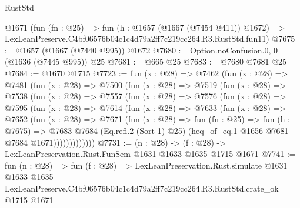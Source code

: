 \begin{lexlean}{RustStd}
\begin{coremodule}
    @1671
    (fun (fn : @25) =>
    fun (h : @1657 (@1667 (@7454 @411)) @1672) =>
    LexLeanPreserve.C4bf06576b04c1c4d79a2ff7c219cc264.R3.RustStd.fun11)
@7675 := @1657 (@1667 (@7440 @995)) @1672
@7680 := Option.noConfusion.{0, 0} (@1636 (@7445 @995)) @25
@7681 := @665 @25
@7683 := @7680 @7681 @25
@7684 := @1670 @1715
@7723 := fun (x : @28) =>
  @7462
    (fun (x : @28) =>
    @7481
      (fun (x : @28) =>
      @7500
        (fun (x : @28) =>
        @7519
          (fun (x : @28) =>
          @7538
            (fun (x : @28) =>
            @7557
              (fun (x : @28) =>
              @7576
                (fun (x : @28) =>
                @7595
                  (fun (x : @28) =>
                  @7614
                    (fun (x : @28) =>
                    @7633
                      (fun (x : @28) =>
                      @7652
                        (fun (x : @28) =>
                        @7671
                          (fun (x : @28) =>
                          fun (fn : @25) =>
                          fun (h : @7675) =>
                          @7683
                            @7684
                            (Eq.refl.{2} (Sort 1) @25)
                            (heq_of_eq.{1} @1656 @7681 @7684 @1671)))))))))))))
@7731 := (n : @28) -> (f : @28) -> LexLeanPreservation.Rust.FunSem @1631 @1633 @1635 @1715 @1671
@7741 := fun (n : @28) =>
  fun (f : @28) =>
  LexLeanPreservation.Rust.simulate
    @1631
    @1633
    @1635
    LexLeanPreserve.C4bf06576b04c1c4d79a2ff7c219cc264.R3.RustStd.crate_ok
    @1715
    @1671
\end{coremodule}
\end{lexlean}
